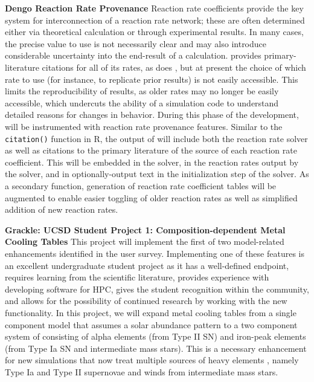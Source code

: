 \noindent \textbf{Dengo Reaction Rate Provenance}
Reaction rate coefficients provide the key system for interconnection of a
reaction rate network; these are often determined either via theoretical
calculation or through experimental results.  In many cases, the precise value
to use is not necessarily clear \citep[][see, e.g.,]{2011ApJ...726...55T} and
may also introduce considerable uncertainty into the end-result of a
calculation.  \grackle{} provides primary-literature citations for all of its
rates, as does \dengo{}, but at present the choice of which rate to use (for
instance, to replicate prior results) is not easily accessible.  This limits
the reproducibility of results, as older rates may no longer be easily
accessible, which undercuts the ability of a simulation code to understand
detailed reasons for changes in behavior.  During this phase of the
development, \dengo{} will be instrumented with reaction rate provenance
features.  Similar to the \texttt{citation()} function in R, the output of
\dengo{} will include both the reaction rate solver as well as citations to the
primary literature of the source of each reaction rate coefficient.  This will
be embedded in the solver, in the reaction rates output by the solver, and in
optionally-output text in the initialization step of the solver.  As a
secondary function,  generation of reaction rate coefficient tables
will be augmented to enable easier toggling of older reaction rates as well as
simplified addition of new reaction rates.

\noindent \textbf{Grackle: UCSD Student Project 1:
  Composition-dependent Metal Cooling Tables}
This project will implement the first of two model-related
enhancements identified in the \grackle{} user survey.
Implementing one of these features is an excellent undergraduate
student project as it has a well-defined endpoint, requires learning
from the scientific literature, provides experience with developing
software for HPC, gives the student recognition within the community,
and allows for the possibility of continued research by working with
the new functionality. In this project, we will expand 
metal cooling tables from a single
component model that assumes a solar abundance pattern to a
two component system of \citet{2013MNRAS.433.3005D} consisting of
alpha elements (from Type II SN)
and iron-peak elements (from Type Ia SN and intermediate mass stars).
This is a necessary enhancement for new simulations that now treat
multiple sources of heavy elements
\citep[e.g.,][]{2014MNRAS.444.1518V, 2015MNRAS.446..521S}, namely Type
Ia and Type II supernovae and winds from intermediate mass stars.

